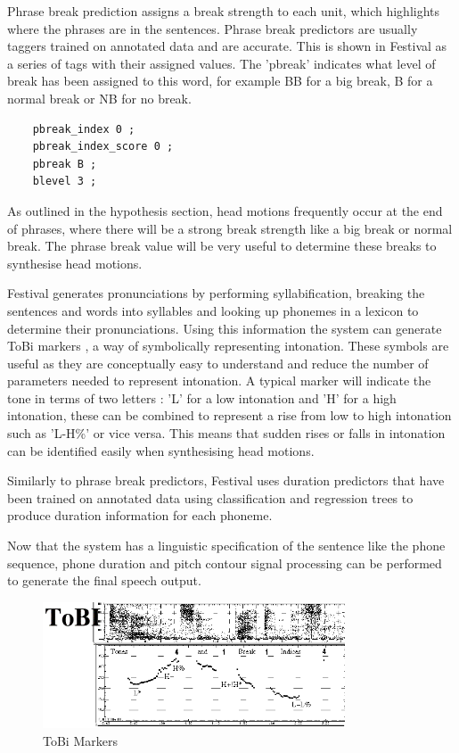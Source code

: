 \documentclass[bsc,frontabs,twoside,singlespacing,parskip]{infthesis}
\begin{document}
Phrase break prediction assigns a break strength to each unit, which highlights where the phrases are in the sentences. Phrase break predictors are usually taggers trained on annotated data and are accurate. This is shown in Festival as a series of tags with their assigned values. The 'pbreak' indicates what level of break has been assigned to this word, for example BB for a big break, B for a normal break or NB for no break.

\begin{lstlisting}
	pbreak_index 0 ;
	pbreak_index_score 0 ;
	pbreak B ; 
	blevel 3 ; 
\end{lstlisting}

As outlined in the hypothesis section, head motions frequently occur at the end of phrases, where there will be a strong break strength like a big break or normal break. The phrase break value will be very useful to determine these breaks to synthesise head motions.

Festival generates pronunciations by performing syllabification, breaking the sentences and words into syllables and looking up phonemes in a lexicon to determine their pronunciations. Using this information the system can generate ToBi markers \cite{tobi}, a way of symbolically representing intonation. These symbols are useful as they are conceptually easy to understand and reduce the number of parameters needed to represent intonation. A typical marker will indicate the tone in terms of two letters : 'L' for a low intonation and 'H' for a high intonation, these can be combined to represent a rise from low to high intonation such as 'L-H\%' or vice versa.  This means that sudden rises or falls in intonation can be identified easily when synthesising head motions. 

Similarly to phrase break predictors, Festival uses duration predictors that have been trained on annotated data using classification and regression trees to produce duration information for each phoneme.

Now that the system has a linguistic specification of the sentence like the phone sequence, phone duration and pitch contour signal processing can be performed to generate the final speech output.

\begin{figure}[h!]
	\centering
	\includegraphics[width=0.8\textwidth]{tobi.png}
	\caption{ToBi Markers}
\end{figure}
\end{document}
